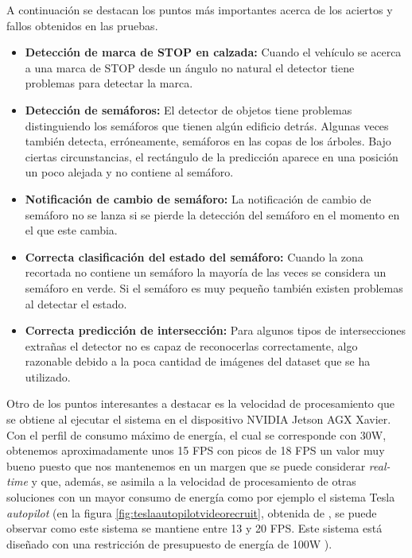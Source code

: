 A continuación se destacan los puntos más importantes acerca de los aciertos y fallos obtenidos en las pruebas.

\begin{itemize}
    \item \textbf{Detección de marca de STOP en calzada:} Cuando el vehículo se acerca a una marca de STOP desde un ángulo no natural el detector tiene problemas para detectar la marca.
    \item \textbf{Detección de semáforos:} El detector de objetos tiene problemas distinguiendo los semáforos que tienen algún edificio detrás. Algunas veces también detecta, erróneamente, semáforos en las copas de los árboles. Bajo ciertas circunstancias, el rectángulo de la predicción aparece en una posición un poco alejada y no contiene al semáforo.
    \item \textbf{Notificación de cambio de semáforo:} La notificación de cambio de semáforo no se lanza si se pierde la detección del semáforo en el momento en el que este cambia.
    \item  \textbf{Correcta clasificación del estado del semáforo:} Cuando la zona recortada no contiene un semáforo la mayoría de las veces se considera un semáforo en verde. Si el semáforo es muy pequeño también existen problemas al detectar el estado.
    \item \textbf{Correcta predicción de intersección:} Para algunos tipos de intersecciones extrañas el detector no es capaz de reconocerlas correctamente, algo razonable debido a la poca cantidad de imágenes del dataset que se ha utilizado.
    
\end{itemize}

Otro de los puntos interesantes a destacar es la velocidad de procesamiento que se obtiene al ejecutar el sistema en el dispositivo NVIDIA Jetson AGX Xavier. Con el perfil de consumo máximo de energía, el cual se corresponde con 30W, obtenemos aproximadamente unos 15 FPS con picos de 18 FPS un valor muy bueno puesto que nos mantenemos en un margen que se puede considerar \textit{real-time} y que, además, se asimila a la velocidad de procesamiento de otras soluciones con un mayor consumo de energía como por ejemplo el sistema Tesla \textit{autopilot} (en la figura \ref{fig:teslaautopilotvideorecruit}, obtenida de \cite{teslaautopilotrecruiting}, se puede observar como este sistema se mantiene entre 13 y 20 FPS. Este sistema está diseñado con una restricción de presupuesto de energía de 100W \cite{teslaAutonomyDay}).
